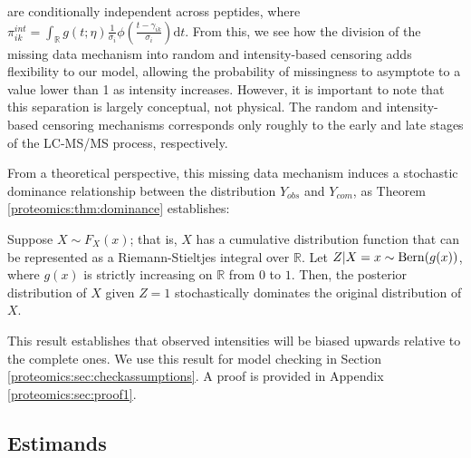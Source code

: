 are conditionally independent across peptides, 
where $\pi^{int}_{ik} = \int_{\mathbb{R}} g(t; \eta) \frac{1}{\sigma_i} \phi\left( \frac{t - \gamma_{ik}}{\sigma_i} \right) \text{d}t$.
From this, we see how the division of the missing data mechanism into random and intensity-based censoring adds flexibility to our model, allowing the probability of missingness to asymptote to a value lower than 1 as intensity increases.
However, it is important to note that this separation is largely conceptual, not physical.
The random and intensity-based censoring mechanisms corresponds only roughly to the early and late stages of the LC-MS/MS process, respectively.

From a theoretical perspective, this missing data mechanism induces a stochastic dominance relationship between the distribution $Y_{obs}$ and $Y_{com}$, as Theorem \ref{proteomics:thm:dominance} establishes:
%
\begin{theorem}\label{proteomics:thm:dominance}
Suppose $X \sim F_X(x)$; that is, $X$ has a cumulative distribution function that can be represented as a Riemann-Stieltjes integral over $\mathbb{R}$. Let $Z | X=x \sim \operatorname{Bern}( g(x) )$, where $g(x)$ is strictly increasing on $\mathbb{R}$ from $0$ to $1$. Then, the posterior distribution of $X$ given $Z=1$ stochastically dominates the original distribution of $X$.
\end{theorem}
%
This result establishes that observed intensities will be biased upwards relative to the complete ones.
We use this result for model checking in Section \ref{proteomics:sec:checkassumptions}. A proof is provided in Appendix \ref{proteomics:sec:proof1}.



\subsection{Estimands}
\label{proteomics:sec:estimand}

